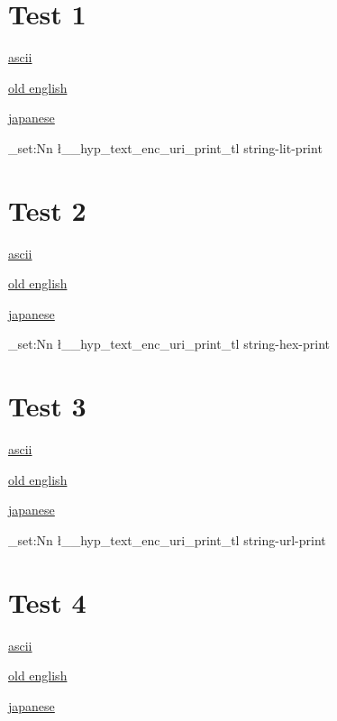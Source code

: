 \documentclass{article}
\begin{document}
\section{Test 1}
\href{https://www.latex-project.org/get/#tex-distributions}{ascii}

\href{https://ang.wikipedia.org/wiki/Elisabeþ_I_Engla_Cwēn}{old english}

\href{https://ja.wikipedia.org/wiki/エリザベス1世_(イングランド女王}{japanese}

\ExplSyntaxOn
\tl_set:Nn \l__hyp_text_enc_uri_print_tl  {string-lit-print}
\ExplSyntaxOff

\section{Test 2}
\href{https://www.latex-project.org/get/#tex-distributions}{ascii}

\href{https://ang.wikipedia.org/wiki/Elisabeþ_I_Engla_Cwēn}{old english}

\href{https://ja.wikipedia.org/wiki/エリザベス1世_(イングランド女王}{japanese}

\ExplSyntaxOn
\tl_set:Nn \l__hyp_text_enc_uri_print_tl  {string-hex-print}
\ExplSyntaxOff

\section{Test 3}
\href{https://www.latex-project.org/get/#tex-distributions}{ascii}

\href{https://ang.wikipedia.org/wiki/Elisabeþ_I_Engla_Cwēn}{old english}

\href{https://ja.wikipedia.org/wiki/エリザベス1世_(イングランド女王}{japanese}

\ExplSyntaxOn
\tl_set:Nn \l__hyp_text_enc_uri_print_tl  {string-url-print}
\ExplSyntaxOff

\section{Test 4}
\href{https://www.latex-project.org/get/#tex-distributions}{ascii}

\href{https://ang.wikipedia.org/wiki/Elisabeþ_I_Engla_Cwēn}{old english}

\href{https://ja.wikipedia.org/wiki/エリザベス1世_(イングランド女王}{japanese}
\end{document}
